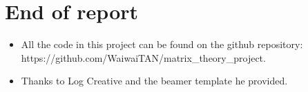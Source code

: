 \documentclass[
    aspectratio=169,                   %
]{beamer}
\begin{document}
\section{End of report}
\begin{frame}
    \begin{itemize}
        \item 
        All the code in this project can be found on the github repository: https://github.com/WaiwaiTAN/matrix\_theory\_project.
        \item 
        Thanks to Log Creative and the beamer template he provided.
    \end{itemize}
\end{frame}

\makebottom     %
\end{document}
